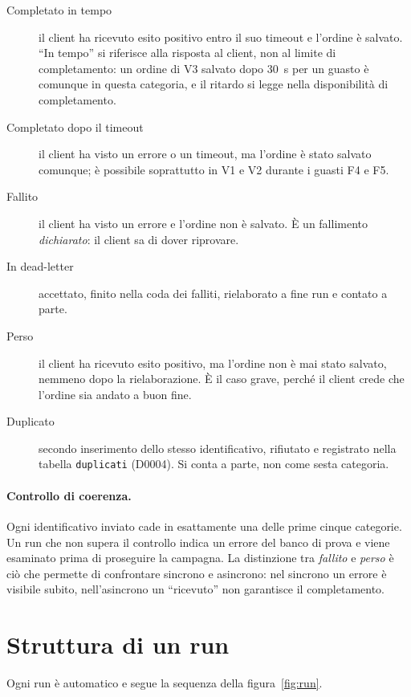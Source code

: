 \begin{description}
  \item[Completato in tempo] il client ha ricevuto esito positivo entro il suo timeout e l'ordine è salvato. ``In tempo'' si riferisce alla risposta al client, non al limite di completamento: un ordine di V3 salvato dopo 30~s per un guasto è comunque in questa categoria, e il ritardo si legge nella disponibilità di completamento.
  \item[Completato dopo il timeout] il client ha visto un errore o un timeout, ma l'ordine è stato salvato comunque; è possibile soprattutto in V1 e V2 durante i guasti F4 e F5.
  \item[Fallito] il client ha visto un errore e l'ordine non è salvato. È un fallimento \emph{dichiarato}: il client sa di dover riprovare.
  \item[In dead-letter] accettato, finito nella coda dei falliti, rielaborato a fine run e contato a parte.
  \item[Perso] il client ha ricevuto esito positivo, ma l'ordine non è mai stato salvato, nemmeno dopo la rielaborazione. È il caso grave, perché il client crede che l'ordine sia andato a buon fine.
  \item[Duplicato] secondo inserimento dello stesso identificativo, rifiutato e registrato nella tabella \texttt{duplicati} (D0004). Si conta a parte, non come sesta categoria.
\end{description}

\paragraph{Controllo di coerenza.} Ogni identificativo inviato cade in esattamente una delle prime cinque categorie. Un run che non supera il controllo indica un errore del banco di prova e viene esaminato prima di proseguire la campagna. La distinzione tra \emph{fallito} e \emph{perso} è ciò che permette di confrontare sincrono e asincrono: nel sincrono un errore è visibile subito, nell'asincrono un ``ricevuto'' non garantisce il completamento.

\section{Struttura di un run}

Ogni run è automatico e segue la sequenza della figura~\ref{fig:run}.

